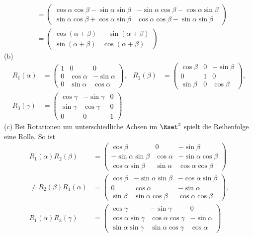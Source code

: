 \documentclass[11pt]{exam}
\begin{document}
\begin{questions}
\begin{solution}
\begin{align*}
		&=\left(\begin{array}{cc}\cos\alpha\cos\beta-\sin\alpha\sin\beta&-\sin\alpha\cos\beta-\cos\alpha\sin\beta\\\sin\alpha\cos\beta+\cos\alpha\sin\beta&\cos\alpha\cos\beta-\sin\alpha\sin\beta\end{array}\right)\\
		&=\left(\begin{array}{cc}\cos(\alpha+\beta)&-\sin(\alpha+\beta)\\\sin(\alpha+\beta)&\cos(\alpha+\beta)\end{array}\right)
	\end{align*}
	(b) \begin{align*}
		R_1(\alpha)&=\left(\begin{array}{ccc}1&0&0\\0&\cos\alpha&-\sin\alpha\\0&\sin\alpha&\cos\alpha\end{array}\right),&R_2(\beta)&=\left(\begin{array}{ccc}\cos\beta&0&-\sin\beta\\0&1&0\\\sin\beta&0&\cos\beta\end{array}\right),\\
		R_3(\gamma)&=\left(\begin{array}{ccc}\cos\gamma&-\sin\gamma&0\\\sin\gamma&\cos\gamma&0\\0&0&1\end{array}\right)
	\end{align*}
	(c) Bei Rotationen um unterschiedliche Achsen im $\Rset^3$ spielt die Reihenfolge eine Rolle. So ist
	\begin{align*}
		R_1(\alpha)R_2(\beta)&=\left(\begin{array}{ccc}\cos\beta&0&-\sin\beta\\-\sin\alpha\sin\beta&\cos\alpha&-\sin\alpha\cos\beta\\\cos\alpha\sin\beta&\sin\alpha&\cos\alpha\cos\beta\end{array}\right)\\
		\neq R_2(\beta)R_1(\alpha)&=\left(\begin{array}{ccc}\cos\beta&-\sin\alpha\sin\beta&-\cos\alpha\sin\beta\\0&\cos\alpha&-\sin\alpha\\\sin\beta&\sin\alpha\cos\beta&\cos\alpha\cos\beta\end{array}\right),\\
		R_1(\alpha)R_3(\gamma)&=\left(\begin{array}{ccc}\cos\gamma&-\sin\gamma&0\\\cos\alpha\sin\gamma&\cos\alpha\cos\gamma&-\sin\alpha\\\sin\alpha\sin\gamma&\sin\alpha\cos\gamma&\cos\alpha\end{array}\right)\\

\end{align*}
\end{solution}
\end{questions}
\end{document}
